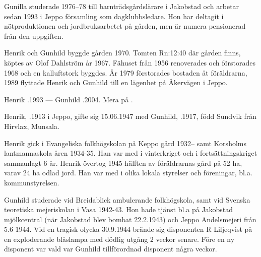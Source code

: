 Gunilla studerade 1976--78 till barnträdsgårdslärare i Jakobstad och arbetar sedan 1993 i Jeppo församling som dagklubbsledare. Hon har deltagit i nötproduktionen och jordbruksarbetet på gården, men är numera pensionerad från den uppgiften.


%
Henrik och Gunhild byggde gården 1970. Tomten Rn:12:40 där gården finns, köptes av Olof Dahlström år 1967. Fähuset från 1956 renoverades och förstorades 1968 och en kalluftstork byggdes. År 1979 förstorades bostaden åt föräldrarna, 1989 flyttade Henrik och Gunhild till en lägenhet på Åkervägen i Jeppo.

Henrik .1993  ---  Gunhild .2004. Mera på .



%



%
Henrik, .1913 i Jeppo, gifte sig 15.06.1947 med Gunhild, .1917, född Sundvik från Hirvlax, Munsala.
\begin{jhchildren}
  \item {}
  \item {}
\end{jhchildren}
Henrik gick i Evangeliska folkhögskolan på Keppo gård 1932-- samt Korsholms lantmannaskola åren 1934-35. Han var med i vinterkriget och i fortsättningskriget sammanlagt 6 år. Henrik övertog 1945 hälften av föräldrarnas gård på 52 ha, varav 24 ha odlad jord. Han var med i olika lokala styrelser och föreningar, bl.a. kommunstyrelsen.

Gunhild studerade vid Breidablick ambulerande folkhögskola, samt vid Svenska teoretiska mejeriskolan i Vasa 1942-43. Hon hade tjänst bl.a på Jakobstad mjölkcentral (när Jakobstad blev bombat 22.2.1943) och Jeppo Andelsmejeri från 5.6 1944. Vid en tragisk olycka 30.9.1944 brände sig disponenten R Liljeqvist på en exploderande blåslampa med dödlig utgång 2 veckor senare. Före en ny disponent var vald var Gunhild tillförordnad disponent några veckor.

